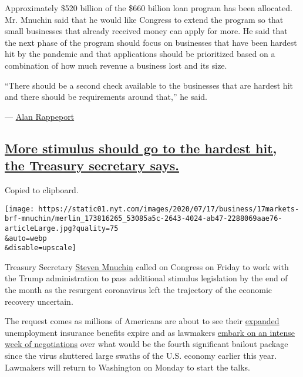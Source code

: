 Approximately \$520 billion of the \$660 billion loan program has been
allocated. Mr. Mnuchin said that he would like Congress to extend the
program so that small businesses that already received money can apply
for more. He said that the next phase of the program should focus on
businesses that have been hardest hit by the pandemic and that
applications should be prioritized based on a combination of how much
revenue a business lost and its size.

``There should be a second check available to the businesses that are
hardest hit and there should be requirements around that,'' he said.

--- \href{https://www.nytimes.com/by/alan-rappeport}{Alan Rappeport}

\hypertarget{more-stimulus-should-go-to-the-hardest-hit-the-treasury-secretary-says}{%
\subsection{\texorpdfstring{\protect\hyperlink{more-stimulus-should-go-to-the-hardest-hit-the-treasury-secretary-says}{More
stimulus should go to the hardest hit, the Treasury secretary
says.}}{More stimulus should go to the hardest hit, the Treasury secretary says.}}\label{more-stimulus-should-go-to-the-hardest-hit-the-treasury-secretary-says}}

Copied to clipboard.

\texttt{[image: https://static01.nyt.com/images/2020/07/17/business/17markets-brf-mnuchin/merlin\_173816265\_53085a5c-2643-4024-ab47-2288069aae76-articleLarge.jpg?quality=75\\\&auto=webp\\\&disable=upscale]}

Treasury Secretary
\href{https://www.nytimes.com/2020/07/17/us/politics/mnuchin-congress-stimulus.html}{Steven
Mnuchin} called on Congress on Friday to work with the Trump
administration to pass additional stimulus legislation by the end of the
month as the resurgent coronavirus left the trajectory of the economic
recovery uncertain.

The request comes as millions of Americans are about to see their
\href{https://www.nytimes.com/interactive/2020/04/23/business/economy/unemployment-benefits-stimulus-coronavirus.html}{expanded}
unemployment insurance benefits expire and as lawmakers
\href{https://www.nytimes.com/2020/07/02/business/economy/congress-economy-coronavirus.html}{embark
on an intense week of negotiations} over what would be the fourth
significant bailout package since the virus shuttered large swaths of
the U.S. economy earlier this year. Lawmakers will return to Washington
on Monday to start the talks.

